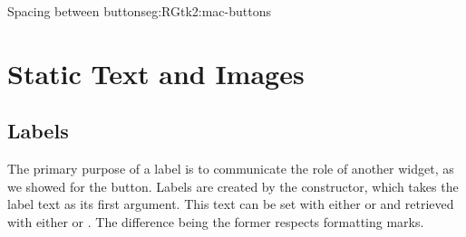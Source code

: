 \begin{example}{Spacing between buttons}{eg:RGtk2:mac-buttons}
\end{example}

\section{Static Text and Images}

\subsection{Labels}
\label{sec:RGtk2:gtkLabel}

The primary purpose of a label is to communicate the role of another
widget, as we showed for the button. Labels are created by the
 constructor, which takes the label text as its
first argument. This text can be set with either
 or  and
retrieved with either  or
.  The difference being the former
respects formatting marks.

